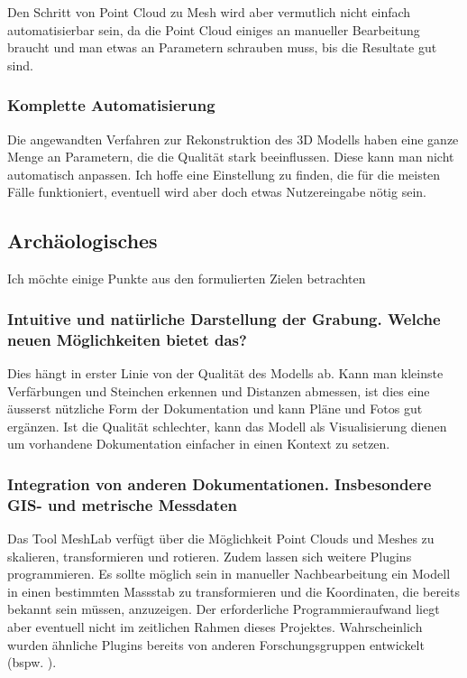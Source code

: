 \documentclass{paper}
\begin{document}
				Den Schritt von Point Cloud zu Mesh wird aber vermutlich nicht einfach automatisierbar sein, da die Point Cloud einiges an manueller Bearbeitung braucht und man etwas an Parametern schrauben muss, bis die Resultate gut sind.
			
			\subsubsection{Komplette Automatisierung}
				Die angewandten Verfahren zur Rekonstruktion des 3D Modells haben eine ganze Menge an Parametern, die die Qualität stark beeinflussen. Diese kann man nicht automatisch anpassen. Ich hoffe eine Einstellung zu finden, die für die meisten Fälle funktioniert, eventuell wird  aber doch etwas Nutzereingabe nötig sein.
		
		\subsection{Archäologisches}
			Ich möchte einige Punkte aus den formulierten Zielen betrachten
			
			\subsubsection{Intuitive und natürliche Darstellung der Grabung. Welche neuen Möglichkeiten bietet das?}
				Dies hängt in erster Linie von der Qualität des Modells ab. Kann man kleinste Verfärbungen und Steinchen erkennen und Distanzen abmessen, ist dies eine äusserst nützliche Form der Dokumentation und kann Pläne und Fotos gut ergänzen.
				Ist die Qualität schlechter, kann das Modell als Visualisierung dienen um vorhandene Dokumentation einfacher in einen Kontext zu setzen.
				
			\subsubsection{Integration von anderen Dokumentationen. Insbesondere GIS- und metrische Messdaten}
				Das Tool MeshLab \cite{meshlab:home} verfügt über die Möglichkeit Point Clouds und Meshes zu skalieren, transformieren und rotieren. Zudem lassen sich weitere Plugins programmieren. Es sollte möglich sein in manueller Nachbearbeitung ein Modell in einen bestimmten Massstab zu transformieren und die Koordinaten, die bereits bekannt sein müssen, anzuzeigen. Der erforderliche Programmieraufwand liegt aber eventuell nicht im zeitlichen Rahmen dieses Projektes. Wahrscheinlich wurden ähnliche Plugins bereits von anderen Forschungsgruppen entwickelt (bspw. \cite{arch:dens_ster_excav}).
				
\end{document}
